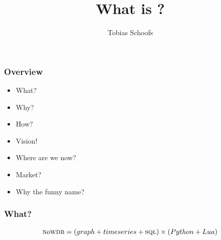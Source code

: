 \documentclass{beamer}
\title{What is \nowdb?}
\author{Tobias Schoofs}
\begin{document}
\frame{\titlepage}

\begin{frame}
\frametitle{Overview}
\begin{itemize}
\item What?
\item Why?
\item How?
\item Vision!
\item Where are we now?
\item Market?
\item Why the funny name?
\end{itemize}
\end{frame}

\begin{frame}
\frametitle{What?}
\begin{equation}
\textsc{n}o\textsc{wdb} = (graph +  timeseries + \textsc{sql}) \times (Python + Lua)
\end{equation}
\end{frame}
\end{document}
